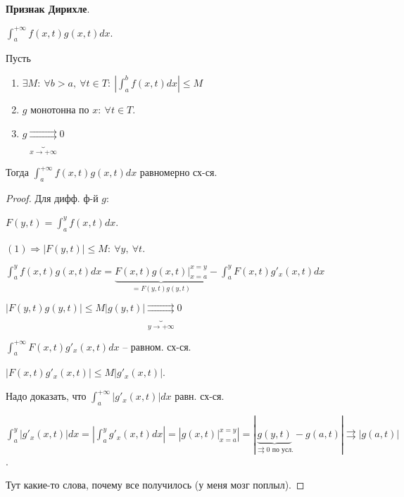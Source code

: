 \begin{theorem}
    \textbf{Признак Дирихле}.

    $\int_{a}^{+\infty} { f(x, t) g(x, t) d x }$.

    Пусть

    \begin{enumerate}
        \item {
            $\exists M: \ \forall b > a, \ \forall t \in T: \ \left| \int_{a}^{b} { f(x, t) dx } \right| \leq M$
        }
        \item {
            $g$ монотонна по $x: \ \forall t \in T$.
        }
        \item {
            $g \underbrace{\rightrightarrows}_{x \rightarrow +\infty} 0$
        }
    \end{enumerate}

    Тогда $\int_{a}^{+\infty} { f(x, t) g(x, t) d x }$ равномерно сх-ся.
\end{theorem}

\begin{proof}
    Для дифф. ф-й $g$:

    $F(y, t) = \int_{a}^{y} { f(x, t) dx }$.

    $(1) \Rightarrow |F(y, t)| \leq M: \ \forall y, \ \forall t$.

    $\int_{a}^{y} { f(x, t) g(x, t) dx } = \underbrace{F(x, t) g(x, t)|_{x=a}^{x=y}}_{= F(y, t) g(y, t)} - \int_{a}^{y} { F(x, t) g'_x(x, t) d x }$

    $\left| F(y, t) g(y, t) \right| \leq M | g(y, t) | \underbrace{\rightrightarrows}_{y \rightarrow +\infty} 0$

    $ \int_{a}^{+\infty} { F(x, t) g'_x(x, t) d x } $ -- равном. сх-ся.

    $|F(x, t) g'_x(x, t)| \leq M | g'_x(x, t) |$.

    Надо доказать, что $\int_{a}^{+\infty} { | g'_x (x, t) | dx }$ равн. сх-ся.

    $\int_{a}^{y} { | g'_x (x, t) | dx } = \left| \int_{a}^{y} { g'_x (x, t) dx } \right| = \left| g(x, t)|_{x=a}^{x=y} \right| = | \underbrace{g(y, t)}_{\rightrightarrows 0 \text{ по усл.}} - g(a, t) | \rightrightarrows |g(a, t)|$.

    Тут какие-то слова, почему все получилось (у меня мозг поплыл).
\end{proof}

